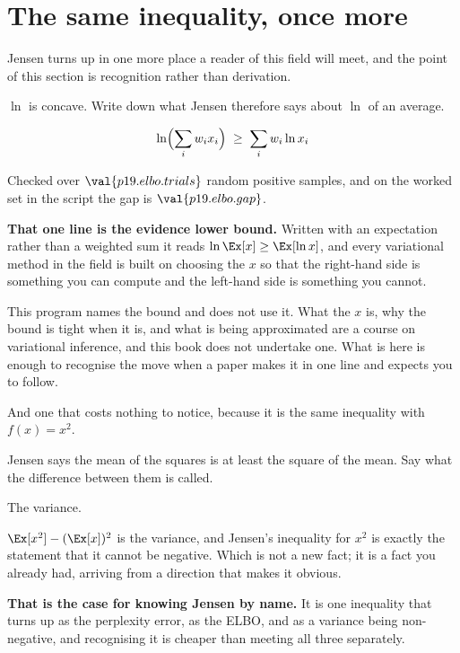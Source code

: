 \section{The same inequality, once more}
\label{sec:P19-elbo}

\begin{fr}
Jensen turns up in one more place a reader of this field will meet, and the
point of this section is recognition rather than derivation.

$\ln$ is concave. Write down what Jensen therefore says about
$\ln$ of an average.
\nextframe
\end{fr}

\begin{fr}
\begin{ansblock}
\[ \ln\Bigl(\sum_i w_i x_i\Bigr) \;\ge\; \sum_i w_i \ln x_i \]
\end{ansblock}

Checked over $\val{p19.elbo.trials}$ random positive samples, and on the
worked set in the script the gap is $\val{p19.elbo.gap}$.

\textbf{That one line is the evidence lower
bound.} Written with an
expectation rather than a weighted sum it reads
$\ln \Ex[x] \ge \Ex[\ln x]$, and every variational method in the field is
built on choosing the $x$ so that the right-hand side is something you can
compute and the left-hand side is something you cannot.

\begin{rigourbox}
This program names the bound and does not use it. What the $x$ is, why the
bound is tight when it is, and what is being approximated are a course on
variational inference, and this book does not undertake one. What is here is
enough to recognise the move when a paper makes it in one line and expects
you to follow.
\end{rigourbox}
\end{fr}

\begin{fr}
And one that costs nothing to notice, because it is the same inequality with
$f(x) = x^{2}$.

Jensen says the mean of the squares is at least the square of the mean. Say
what the difference between them is called.
\dotline
\nextframe
\end{fr}

\begin{fr}
\begin{ansblock}
The variance.
\end{ansblock}

$\Ex[x^{2}] - (\Ex[x])^{2}$ is the variance, and Jensen's inequality for
$x^{2}$ is exactly the statement that it cannot be negative. Which is not a
new fact; it is a fact you already had, arriving from a direction that makes
it obvious.

\textbf{That is the case for knowing Jensen by name.} It is one inequality
that turns up as the perplexity error, as the ELBO, and as a variance being
non-negative, and recognising it is cheaper than meeting all three
separately.
\end{fr}

